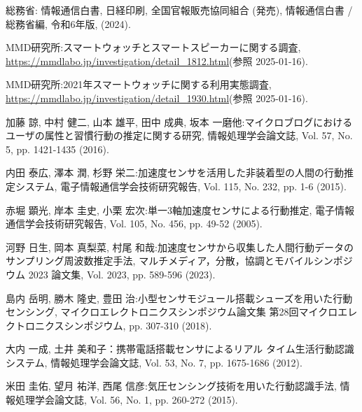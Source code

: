 \thispagestyle{myheadings}
    
\begin{thebibliography}{参考文献}

	総務省: 情報通信白書, 日経印刷, 全国官報販売協同組合 (発売), 情報通信白書 / 総務省編, 令和6年版, (2024).


	MMD研究所:スマートウォッチとスマートスピーカーに関する調査, \url{https://mmdlabo.jp/investigation/detail_1812.html}(参照 2025-01-16).

	MMD研究所:2021年スマートウォッチに関する利用実態調査, \url{https://mmdlabo.jp/investigation/detail_1930.html}(参照 2025-01-16).
	

	加藤 諒, 中村 健二, 山本 雄平, 田中 成典, 坂本 一磨他:マイクロブログにおけるユーザの属性と習慣行動の推定に関する研究, 情報処理学会論文誌, Vol. 57, No. 5, pp. 1421-1435 (2016).

	内田 泰広, 澤本 潤, 杉野 栄二:加速度センサを活用した非装着型の人間の行動推定システム, 電子情報通信学会技術研究報告, Vol. 115, No. 232, pp. 1-6 (2015).

	赤堀 顕光, 岸本 圭史, 小栗 宏次:単一3軸加速度センサによる行動推定, 電子情報通信学会技術研究報告, Vol. 105, No. 456, pp. 49-52 (2005).

	河野 日生, 岡本 真梨菜, 村尾 和哉:加速度センサから収集した人間行動データのサンプリング周波数推定手法, マルチメディア，分散，協調とモバイルシンポジウム 2023 論文集, Vol. 2023, pp. 589-596 (2023).

	島内 岳明, 勝木 隆史, 豊田 治:小型センサモジュール搭載シューズを用いた行動センシング, マイクロエレクトロニクスシンポジウム論文集 第28回マイクロエレクトロニクスシンポジウム, pp. 307-310 (2018).

	大内 一成, 土井 美和子：携帯電話搭載センサによるリアル
	タイム生活行動認識システム, 情報処理学会論文誌, Vol. 53,
	No. 7, pp. 1675-1686 (2012).

	米田 圭佑, 望月 祐洋, 西尾 信彦:気圧センシング技術を用いた行動認識手法, 情報処理学会論文誌, Vol. 56, No. 1, pp. 260-272 (2015).


\end{thebibliography}
